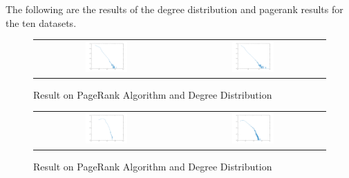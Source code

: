 The following are the results of the degree distribution and pagerank results for the ten datasets.
\begin{figure}[H]
\begin{center}
\begin{tabular}{cc}
     \includegraphics[width=0.3\textwidth]{FIG/1pagerank.png} &
     \includegraphics[width=0.3\textwidth]{FIG/1degreedist.png} \\
\end{tabular}
\caption{Result on PageRank Algorithm and Degree Distribution}
\end{center}
\end{figure}

\begin{figure}[H]
\begin{center}
\begin{tabular}{cc}
     \includegraphics[width=0.3\textwidth]{FIG/2pagerank.png} &
     \includegraphics[width=0.3\textwidth]{FIG/2degreedist.png} \\
\end{tabular}
\caption{Result on PageRank Algorithm and Degree Distribution}
\end{center}
\end{figure}

